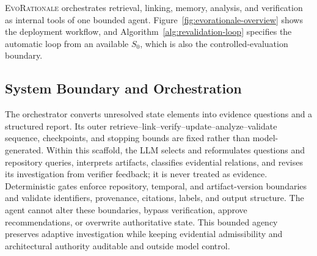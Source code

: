 \documentclass[10pt,conference]{IEEEtran}
\begin{document}
\textsc{EvoRationale} orchestrates retrieval, linking, memory, analysis, and verification as internal tools of one bounded agent. Figure~\ref{fig:evorationale-overview} shows the deployment workflow, and Algorithm~\ref{alg:revalidation-loop} specifies the automatic loop from an available $S_0$, which is also the controlled-evaluation boundary.

\subsection{System Boundary and Orchestration}
\label{sec:architecture-orchestration}

The orchestrator converts unresolved state elements into evidence questions and a structured report. Its outer retrieve--link--verify--update--analyze--validate sequence, checkpoints, and stopping bounds are fixed rather than model-generated. Within this scaffold, the LLM selects and reformulates questions and repository queries, interprets artifacts, classifies evidential relations, and revises its investigation from verifier feedback; it is never treated as evidence. Deterministic gates enforce repository, temporal, and artifact-version boundaries and validate identifiers, provenance, citations, labels, and output structure. The agent cannot alter these boundaries, bypass verification, approve recommendations, or overwrite authoritative state. This bounded agency preserves adaptive investigation while keeping evidential admissibility and architectural authority auditable and outside model control.
\end{document}
